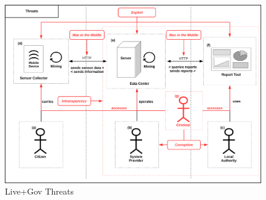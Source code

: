 \begin{figure}
\centering
\includegraphics[width=\textwidth]{diagrams/png/threats.png}

%

\caption{Live+Gov Threats}
\label{figure:Live+Gov Threats}
\end{figure}
